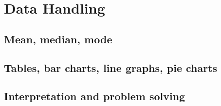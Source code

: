 
\section{Data Handling}

\subsection{Mean, median, mode}


\subsection{Tables, bar charts, line graphs, pie charts}


\subsection{Interpretation and problem solving}

